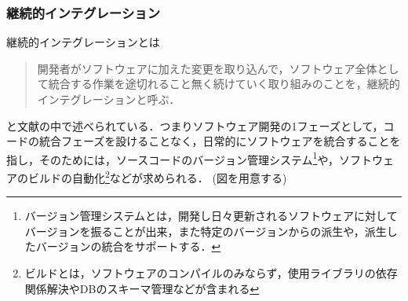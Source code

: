 \subsubsection{継続的インテグレーション}

継続的インテグレーションとは

\begin{quote}

  開発者がソフトウェアに加えた変更を取り込んで，ソフトウェア全体として統合する作業を途切れること無く続けていく取り組みのことを，継続的インテグレーションと呼ぶ．

\end{quote}

と文献\cite{西村直人2011アジャイルサムライ}の中で述べられている．つまりソフトウェア開発の1フェーズとして，コードの統合フェーズを設けることなく，日常的にソフトウェアを統合することを指し，そのためには，ソースコードのバージョン管理システム\footnote{バージョン管理システムとは，開発し日々更新されるソフトウェアに対してバージョンを振ることが出来，また特定のバージョンからの派生や，派生したバージョンの統合をサポートする．}や，ソフトウェアのビルドの自動化\footnote{ビルドとは，ソフトウェアのコンパイルのみならず，使用ライブラリの依存関係解決やDBのスキーマ管理などが含まれる}などが求められる． (図を用意する)
